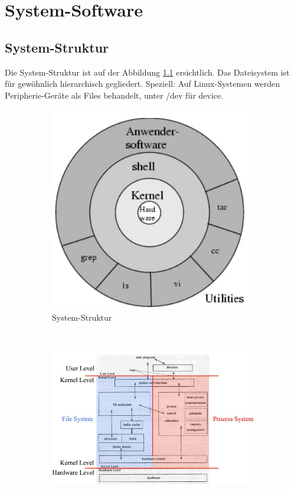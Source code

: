 \chapter{System-Software}

\section{System-Struktur}
Die System-Struktur ist auf der Abbildung \ref{fig:system-software-system-struktur} ersichtlich. Das Dateisystem ist für gewöhnlich hierarchisch gegliedert. Speziell: Auf Linux-Systemen werden Peripherie-Geräte als Files behandelt, unter /dev für device.

\begin{figure}[h!]
	\centering
	\begin{subfigure}[b]{0.4\textwidth}
	       	\includegraphics[width=\textwidth]{fig/system-software-system-struktur}
	       	\caption{System-Struktur}
	       	\label{fig:system-software-system-struktur}
	\end{subfigure}
	~
	\begin{subfigure}[b]{0.5\textwidth}
		\includegraphics[width=\textwidth]{fig/system-software-systemkern}

\end{subfigure}
\end{figure}
